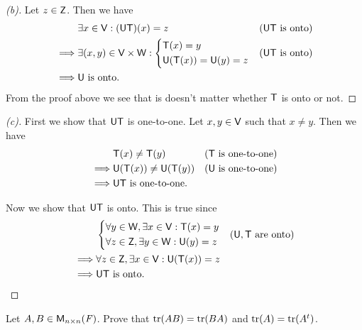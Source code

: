 \begin{proof}[(b)]
  Let \(z \in \mathsf{Z}\).
  Then we have
  \begin{align*}
             & \exists x \in \mathsf{V} : (\mathsf{U} \mathsf{T})(x) = z                &  & \text{(\(\mathsf{U}\mathsf{T}\) is onto)} \\
    \implies & \exists (x, y) \in \mathsf{V} \times \mathsf{W} : \begin{dcases}
                                                   \mathsf{T}(x) = y \\
                                                   \mathsf{U}(\mathsf{T}(x)) = \mathsf{U}(y) = z
                                                 \end{dcases} &  & \text{(\(\mathsf{U}\mathsf{T}\) is onto)}   \\
    \implies & \mathsf{U} \text{ is onto}.
  \end{align*}
  From the proof above we see that is doesn't matter whether \(\mathsf{T}\) is onto or not.
\end{proof}

\begin{proof}[(c)]
  First we show that \(\mathsf{U} \mathsf{T}\) is one-to-one.
  Let \(x, y \in \mathsf{V}\) such that \(x \neq y\).
  Then we have
  \begin{align*}
             & \mathsf{T}(x) \neq \mathsf{T}(y)             &  & \text{(\(\mathsf{T}\) is one-to-one)} \\
    \implies & \mathsf{U}(\mathsf{T}(x)) \neq \mathsf{U}(\mathsf{T}(y))     &  & \text{(\(\mathsf{U}\) is one-to-one)} \\
    \implies & \mathsf{U} \mathsf{T} \text{ is one-to-one}.
  \end{align*}

  Now we show that \(\mathsf{U} \mathsf{T}\) is onto.
  This is true since
  \begin{align*}
             & \begin{dcases}
                 \forall y \in \mathsf{W}, \exists x \in \mathsf{V} : \mathsf{T}(x) = y \\
                 \forall z \in \mathsf{Z}, \exists y \in \mathsf{W} : \mathsf{U}(y) = z
               \end{dcases}     &  & \text{(\(\mathsf{U}, \mathsf{T}\) are onto)}     \\
    \implies & \forall z \in \mathsf{Z}, \exists x \in \mathsf{V} : \mathsf{U}(\mathsf{T}(x)) = z \\
    \implies & \mathsf{U} \mathsf{T} \text{ is onto}.
  \end{align*}
\end{proof}

\begin{ex}\label{ex:2.3.13}
  Let \(A, B \in \mathsf{M}_{{n} \times n}({\mathit{F}})\).
  Prove that \(\tr[AB] = \tr[BA]\) and \(\tr[A] = \tr[\tp{A}]\).
\end{ex}

